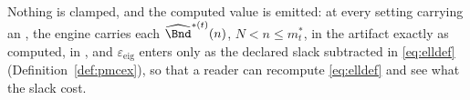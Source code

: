 
\begin{requirement}
\label{req:exact-window-record}
Nothing is clamped, and the computed value is emitted: at every setting
carrying an , the engine carries each
$\widehat\Bnd^{\ast(t)}(n)$, $N<n\le m^{\ast}_t$, in the artifact exactly as
computed, in , and
$\varepsilon_{\mathrm{eig}}$ enters only as the declared slack subtracted in
\eqref{eq:elldef} (Definition~\ref{def:pmcex}), so that a reader can
recompute \eqref{eq:elldef} and see what the slack cost.
\end{requirement}
